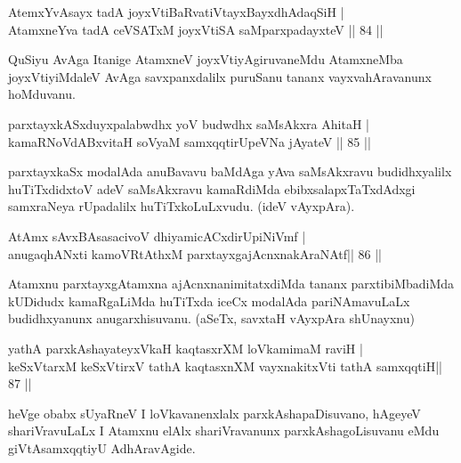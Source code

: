 \begin{shl}
AtemxYvAsayx tadA joyxVtiBaRvatiVtayxBayxdhAdaqSiH | \\
AtamxneYva tadA ceVSATxM joyxVtiSA saMparxpadayxteV \hfill||  84 ||  
\end{shl}

\begin{artha}
QuSiyu AvAga Itanige AtamxneV joyxVtiyAgiruvaneMdu AtamxneMba joyxVtiyiMdaleV AvAga savxpanxdalilx puruSanu tananx vayxvahAravanunx hoMduvanu.
\end{artha}


\begin{shl}
parxtayxkASxduyxpalabwdhx yoV budwdhx saMsAkxra AhitaH | \\
kamaRNoVdABxvitaH soV\s yaM samxqqtirUpeVNa jAyateV \hfill||  85 ||  
\end{shl}

\begin{artha}
parxtayxkaSx modalAda anuBavavu baMdAga yAva saMsAkxravu budidhxyalilx huTiTxdidxtoV adeV saMsAkxravu kamaRdiMda ebibxsalapxTaTxdAdxgi samxraNeya rUpadalilx huTiTxkoLuLxvudu. (ideV vAyxpAra).
\end{artha}


\begin{shl}
AtAmx sAvxBAsasacivoV dhiyamicACxdirUpiNiVmf | \\
anugaqhANxti kamoVRtAthxM parxtayxgajAcnxnakAraNAtf\hfill ||  86 ||  
\end{shl}

\begin{artha}
Atamxnu parxtayxgAtamxna ajAcnxnanimitatxdiMda tananx parxtibiMbadiMda kUDidudx kamaRgaLiMda huTiTxda iceCx modalAda pariNAmavuLaLx budidhxyanunx anugarxhisuvanu. (aSeTx, savxtaH vAyxpAra shUnayxnu)
\end{artha}


\begin{shl}
yathA parxkAshayateyxVkaH kaqtasxrXM loVkamimaM raviH | \\
keSxVtarxM keSxVtirxV tathA kaqtasxnXM vayxnakitxVti tathA samxqqtiH\hfill ||  87 ||  
\end{shl}

\begin{artha}
heVge obabx sUyaRneV I loVkavanenxlalx parxkAshapaDisuvano, hAgeyeV shariVravuLaLx I Atamxnu elAlx shariVravanunx parxkAshagoLisuvanu eMdu giVtAsamxqqtiyU AdhAravAgide.
\end{artha}

